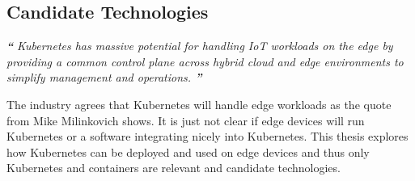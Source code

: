 \clearpage
\subsection{Candidate Technologies} \label{sec:candidateTechnologies}

\begin{displayquote}
\textit{\textbf{\Huge{``}}}
\textit{\large{
Kubernetes has massive potential for handling IoT workloads on the edge by providing a common control plane across hybrid cloud and edge environments to simplify management and operations\cite{ioFogMainBlog:online}.
}}
\textit{\textbf{\Huge{''}}}
\\[1pt]
\end{displayquote}

The industry agrees that Kubernetes will handle edge workloads as the quote from Mike Milinkovich shows. It is just not clear if edge devices will run Kubernetes or a software integrating nicely into Kubernetes. This thesis explores how Kubernetes can be deployed and used on edge devices and thus only Kubernetes and containers are relevant and candidate technologies.



